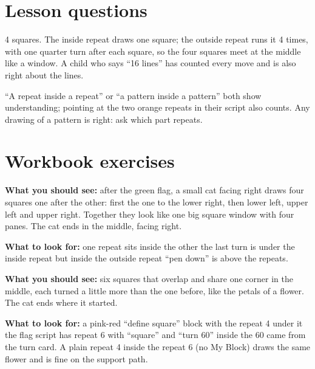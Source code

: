 
\section{Lesson questions}
\begin{answer}
4 squares. The inside repeat draws one square; the outside repeat runs it 4 times, with one quarter turn after each square, so the four squares meet at the middle like a window. A child who says \enquote{16 lines} has counted every move and is also right about the lines.
\end{answer}

\begin{answer}[Reflection]
\enquote{A repeat inside a repeat} or \enquote{a pattern inside a pattern} both show understanding; pointing at the two orange repeats in their script also counts. Any drawing of a pattern is right: ask which part repeats.
\end{answer}

\section{Workbook exercises}
\begin{answer}
\textbf{What you should see:} after the green flag, a small cat facing right draws four squares one after the other: first the one to the lower right, then lower left, upper left and upper right. Together they look like one big square window with four panes. The cat ends in the middle, facing right.

\textbf{What to look for:} \tickbox{} one repeat sits inside the other \quad \tickbox{} the last turn is under the inside repeat but inside the outside repeat \quad \tickbox{} \enquote{pen down} is above the repeats.
\end{answer}

\begin{answer}
\textbf{What you should see:} six squares that overlap and share one corner in the middle, each turned a little more than the one before, like the petals of a flower. The cat ends where it started.

\textbf{What to look for:} \tickbox{} a pink-red \enquote{define square} block with the repeat 4 under it \quad \tickbox{} the flag script has repeat 6 with \enquote{square} and \enquote{turn 60} inside \quad \tickbox{} the 60 came from the turn card. A plain repeat 4 inside the repeat 6 (no My Block) draws the same flower and is fine on the support path.
\end{answer}

